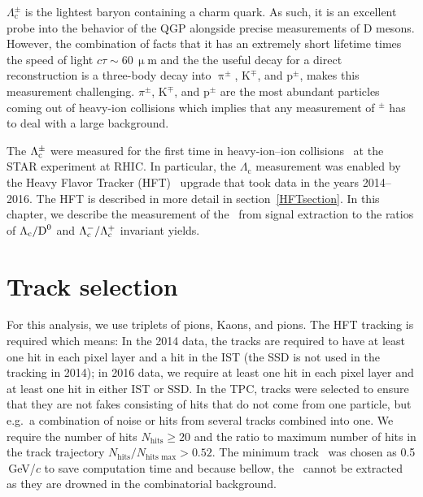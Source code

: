 $\Lambda_\mathrm{c}^\pm$ is the lightest baryon containing a charm quark. As such, it is an excellent probe into the behavior of the QGP alongside precise measurements of D mesons. However, the combination of facts that it has an extremely short lifetime times the speed of light $c\tau \sim 60\,\upmu$m and the the useful decay for a direct reconstruction is a three-body decay into $\uppi^\pm$, K$^\mp$, and p$^\pm$, makes this measurement challenging. $\pi^\pm$, K$^\mp$, and p$^\pm$ are the most abundant particles coming out of heavy-ion collisions which implies that any measurement of \Lambdac$^\pm$ has to deal with a large background.

The $\Lambda_\text{c}^\pm$ were measured for the first time in heavy-ion--ion collisions~\cite{GuannanLc} at the STAR experiment at RHIC\@. In particular, the $\Lambda_\mathrm{c}$ measurement was enabled by the Heavy Flavor Tracker (HFT)~\cite{Kapitan} upgrade that took data in the years 2014--2016\@. The HFT is described in more detail in section~\ref{HFTsection}\@. In this chapter, we describe the measurement of the \Lambdac\ from signal extraction to the ratios of $\Lambda_\text{c}/\text{D}^0$ and $\Lambda_\text{c}^-/\Lambda_\text{c}^+$ invariant yields. 

\section{Track selection}
For this analysis, we use triplets of pions, Kaons, and pions. The HFT tracking is required which means: In the 2014 data, the tracks are required to have at least one hit in each pixel layer and a hit in the IST (the SSD is not used in the tracking in 2014); in 2016 data, we require at least one hit in each pixel layer and at least one hit in either IST or SSD\@.  In the TPC, tracks were selected to ensure that they are not fakes consisting of hits that do not come from one particle, but e.g.\ a combination of noise or hits from several tracks combined into one. We require the number of hits $N_\mathrm{hits} \geq 20$ and the ratio to maximum number of hits in the track trajectory $N_\mathrm{hits}/N_\text{hits max} > 0.52$\@. The minimum track \pt\ was chosen as 0.5$\,$GeV/$c$ to save computation time and because bellow, the \Lambdac\ cannot be extracted as they are drowned in the combinatorial background\@.

